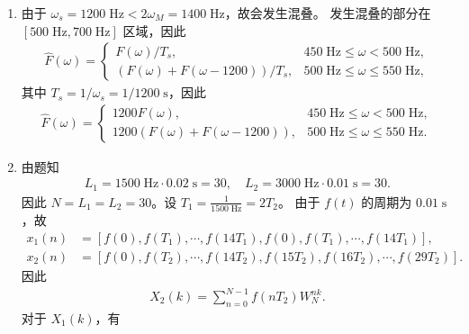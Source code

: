 \begin{solution}
    \begin{enumerate}[label=(\arabic*)]
        \item 由于 $\omega_s = 1200\;\mathrm{Hz} < 2\omega_M = 1400\;\mathrm{Hz}$，故会发生混叠。
            发生混叠的部分在 $[500\;\mathrm{Hz}, 700\;\mathrm{Hz}]$ 区域，因此
            \begin{align*}
                \hat{F}(\omega) = \begin{cases}
                    F(\omega)/T_s, & 450\;\mathrm{Hz} \le \omega < 500\;\mathrm{Hz}, \\
                    \left(F(\omega) + F(\omega - 1200)\right)/T_s, & 500\;\mathrm{Hz} \le \omega \le 550\;\mathrm{Hz},
                \end{cases}
            \end{align*}
            其中 $T_s = 1 / \omega_s = 1 / 1200\;\mathrm{s}$，因此
            \begin{align*}
                \hat{F}(\omega) = \begin{cases}
                    1200F(\omega), & 450\;\mathrm{Hz} \le \omega < 500\;\mathrm{Hz}, \\
                    1200\left(F(\omega) + F(\omega - 1200)\right), & 500\;\mathrm{Hz} \le \omega \le 550\;\mathrm{Hz}.
                \end{cases}
            \end{align*}
        \item 由题知
            \begin{align*}
                L_1 = 1500\;\mathrm{Hz} \cdot 0.02\;\mathrm{s} = 30, \quad
                L_2 = 3000\;\mathrm{Hz} \cdot 0.01\;\mathrm{s} = 30.
            \end{align*}
            因此 $N = L_1 = L_2 = 30$。设 $T_1 = \frac{1}{1500\;\mathrm{Hz}} = 2T_2$。
            由于 $f(t)$ 的周期为 $0.01\;\mathrm{s}$，故
            \begin{align*}
                x_1(n) & = [f(0), f(T_1), \cdots, f(14T_1), f(0), f(T_1), \cdots, f(14T_1)], \\
                x_2(n) & = [f(0), f(T_2), \cdots, f(14T_2), f(15T_2), f(16T_2), \cdots, f(29T_2)].
            \end{align*}
            因此
            \begin{align*}
                X_2(k) = \sum_{n = 0}^{N - 1}f(nT_2)W_N^{nk}.
            \end{align*}
            对于 $X_1(k)$，有
            \begin{align*}

\end{align*}
\end{enumerate}
\end{solution}
